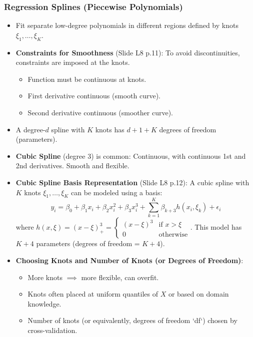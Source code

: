\documentclass[12pt,a4paper]{article}
\begin{document}
\begin{itemize}
    \subsubsection{Regression Splines (Piecewise Polynomials) }
        \begin{itemize}
            \item Fit separate low-degree polynomials in different regions defined by knots $\xi_1, \dots, \xi_K$.
            \item \textbf{Constraints for Smoothness} (Slide L8 p.11): To avoid discontinuities, constraints are imposed at the knots.
                \begin{itemize}
                    \item Function must be continuous at knots.
                    \item First derivative continuous (smooth curve).
                    \item Second derivative continuous (smoother curve).
                \end{itemize}
            \item A degree-$d$ spline with $K$ knots has $d+1+K$ degrees of freedom (parameters).
            \item \textbf{Cubic Spline} (degree 3) is common: Continuous, with continuous 1st and 2nd derivatives. Smooth and flexible.
            \item \textbf{Cubic Spline Basis Representation} (Slide L8 p.12):
                A cubic spline with $K$ knots $\xi_1, \dots, \xi_K$ can be modeled using a basis:
                $$ y_i = \beta_0 + \beta_1 x_i + \beta_2 x_i^2 + \beta_3 x_i^3 + \sum_{k=1}^K \beta_{k+3} h(x_i, \xi_k) + \epsilon_i $$
                where $h(x, \xi) = (x-\xi)_+^3 = \begin{cases} (x-\xi)^3 & \text{if } x > \xi \\ 0 & \text{otherwise} \end{cases}$.
                This model has $K+4$ parameters (degrees of freedom = $K+4$).
            \item \textbf{Choosing Knots and Number of Knots (or Degrees of Freedom)}:
                \begin{itemize}
                    \item More knots $\implies$ more flexible, can overfit.
                    \item Knots often placed at uniform quantiles of $X$ or based on domain knowledge.
                    \item Number of knots (or equivalently, degrees of freedom `df`) chosen by cross-validation.

\end{itemize}
\end{itemize}
\end{itemize}
\end{document}
